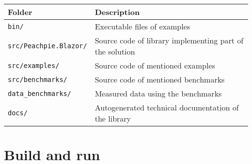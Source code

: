 \documentclass[12pt,a4paper]{report}
\begin{document}
\begin{table}[H]
\centering
\begin{tabular}{ | m{11em} | m{22em}| } 
\hline
Folder & Description \\
\hline
\texttt{bin/} & Executable files of examples \\
\texttt{src/Peachpie.Blazor/} & Source code of library implementing part of the solution \\
\texttt{src/examples/} & Source code of mentioned examples \\
\texttt{src/benchmarks/} & Source code of mentioned benchmarks \\
\texttt{data\_benchmarks/} & Measured data using the benchmarks \\
\texttt{docs/} & Autogenerated technical documentation of the library \\
\hline
\end{tabular}
\end{table}


\section{Build and run}
\end{document}
